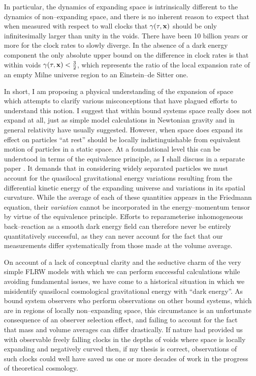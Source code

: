 \documentclass[12pt]{article}
\begin{document}
In particular, the dynamics
of expanding space is intrinsically different to the dynamics of
non--expanding space, and there is no inherent reason to expect
that when measured with respect to wall clocks that $\gamma(\tau,{\mathbf x})$ should
be only infinitesimally larger than unity in the voids. There have been
10 billion years or more for the clock rates to slowly diverge. In the
absence of a dark energy component the only absolute upper bound on
the difference in clock rates is that within voids $\gamma(\tau,{\mathbf x})<\frac32$,
which represents the ratio of the local expansion rate of an empty Milne
universe region to an Einstein--de Sitter one.

In short, I am proposing a physical understanding of the expansion of space
which attempts to clarify various misconceptions that have plagued
efforts to understand this notion. I suggest that within bound systems
space really does not expand at all, just as simple model calculations in
Newtonian gravity \cite{Price} and in general relativity \cite{gruyere} have
usually suggested. However, when space does expand
its effect on particles ``at rest'' should be locally indistinguishable from
equivalent motion of particles in a static space. At a foundational
level this can be understood in terms of the equivalence principle,
as I shall discuss in a separate paper \cite{equiv}. It demands that in
considering widely separated particles we must account for the quasilocal
gravitational energy variations resulting from the differential
kinetic energy of the expanding universe and variations in its spatial
curvature. While the average of each of these quantities appears in
the Friedmann equation, their {\em variation} cannot be
incorporated in the energy--momentum tensor by virtue of the equivalence
principle. Efforts to reparameterise inhomogeneous back--reaction
as a smooth dark energy field \cite{morpho} can therefore never be entirely
quantitatively successful, as they can never account for the fact
that our measurements differ systematically from those made at the volume
average.

On account of a lack of conceptual clarity and the seductive charm of the
very simple FLRW models with which we can perform successful calculations
while avoiding fundamental issues, we have come to a historical situation in
which we misidentify quasilocal cosmological
gravitational energy with ``dark energy''. As bound system observers who
perform observations on other bound systems, which are in regions of
locally non--expanding space, this circumstance is an unfortunate
consequence of an observer selection effect, and failing to account for
the fact that mass and volume averages can differ drastically. If nature
had provided us with observable freely falling clocks in the depths of
voids where space is locally expanding and negatively curved then, if my
thesis is correct, observations of such clocks could well have saved us
one or more decades of work in the progress of theoretical cosmology.
\end{document}
